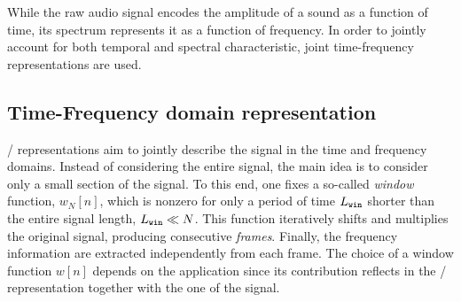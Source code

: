 \mynewline
While the raw audio signal encodes the amplitude of a sound as a function of time, its spectrum represents it as a function of frequency.
In order to jointly account for both temporal and spectral characteristic, joint time-frequency representations are used.

\subsection{Time-Frequency domain representation}\label{subsec:processing:stft}
\TFdef/ representations aim to jointly describe the signal in the time and frequency domains.
Instead of considering the entire signal, the main idea is to consider only a small section of the signal.
To this end, one fixes a so-called \textit{window} function, $w_N[n]$, which is nonzero for only a period of time $L_\mathtt{win}$ shorter than the entire signal length, $L_\mathtt{win} \ll N$.
This function iteratively shifts and multiplies the original signal, producing consecutive \textit{frames}.
Finally, the frequency information are extracted independently from each frame.
The choice of a window function $w[n]$ depends on the application since its contribution reflects in the \TF/ representation together with the
one of the signal.

